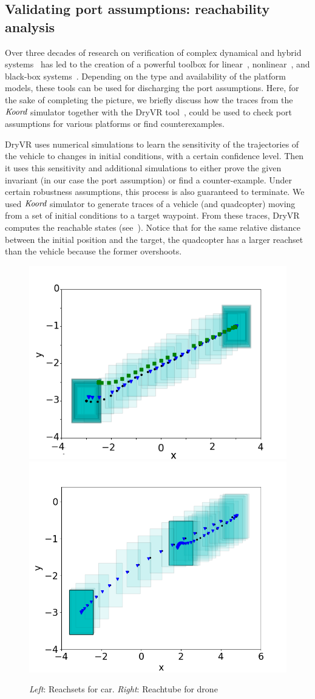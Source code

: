 \subsection{Validating port assumptions: reachability analysis}
\label{sec:port-assumptions}
 Over  three decades of research on verification of complex dynamical and hybrid systems~\cite{Alur:2015:PCS,Platzer:2018} has led to the creation of a powerful toolbox for linear~\cite{bak2017hylaa,Spaceex}, nonlinear~\cite{CAS13,DMVemsoft2013,FanQM0D16:CAV}, and black-box systems~\cite{DryVR2017}. Depending on the type and availability of the platform models, these tools can be used for discharging the port assumptions. Here, for the sake of completing the picture, we briefly discuss how the traces from the $\emph{Koord}$ simulator together with the DryVR tool~\cite{DryVR2017},  could be used to check port assumptions for various platforms or find counterexamples. 
 
 DryVR uses numerical simulations to learn the sensitivity of the trajectories of the vehicle to changes in initial conditions, with a certain confidence level. Then it uses this sensitivity and additional simulations to either prove the given invariant (in our case the port assumption) or find a counter-example. Under certain robustness assumptions, this process is also guaranteed to terminate. We used $\emph{Koord}$ simulator to generate traces of a vehicle (and quadcopter) moving from a set of initial conditions to a target waypoint. From these traces, DryVR computes the reachable states (see~). Notice that for the same relative distance between the initial position and the target, the quadcopter has a larger reachset than the vehicle because the former overshoots. 
\begin{figure}[!h]
            \captionsetup{font=scriptsize}
    \includegraphics[width=0.4\linewidth]{figs/car_trajs.png}
    \includegraphics[width=0.4\linewidth]{figs/drone_trajs.png}
    \caption{\emph{Left}: Reachsets  for car. \emph{Right}: Reachtube for drone}
    \label{fig:dryVR}
\end{figure}